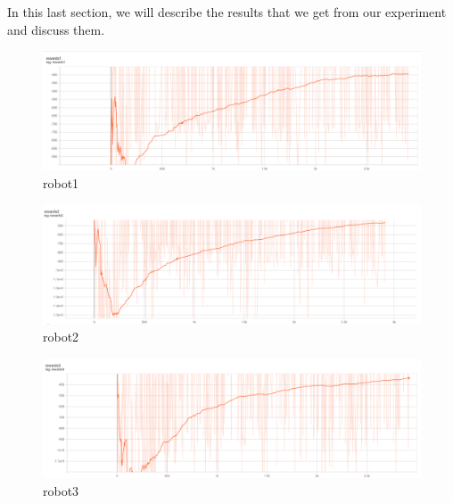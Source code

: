 \documentclass[12pt]{extarticle}
\begin{document}
In this last section, we will describe the results that we get from our experiment and discuss them.



\begin{figure}[h]  

\includegraphics[scale=0.35]{robot1}
\caption[robot1]{robot1}
\end{figure}

\begin{figure}[h]  

\includegraphics[scale=0.35]{robot2}
\caption[robot2]{robot2}
\end{figure}

\begin{figure}[h]  

\includegraphics[scale=0.35]{robot3}
\caption[robot3]{robot3}
\end{figure}



 


\newpage


\end{document}
